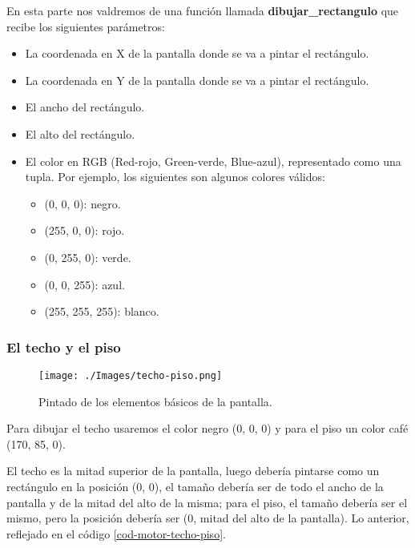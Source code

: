 En esta parte nos valdremos de una función llamada \textbf{dibujar\_rectangulo} que recibe los siguientes parámetros:

\begin{itemize}
\item La coordenada en X de la pantalla donde se va a pintar el rectángulo.
\item La coordenada en Y de la pantalla donde se va a pintar el rectángulo.
\item El ancho del rectángulo.
\item El alto del rectángulo.
\item El color en RGB (Red-rojo, Green-verde, Blue-azul), representado como una tupla. Por ejemplo, los siguientes son algunos colores válidos:
	\begin{itemize}
	\item (0, 0, 0): negro.
	\item (255, 0, 0): rojo.
	\item (0, 255, 0): verde.
	\item (0, 0, 255): azul.
	\item (255, 255, 255): blanco.
	\end{itemize}
\end{itemize}

\subsubsection{El techo y el piso}

\begin{figure}[h!]
	\centering
	\texttt{[image: ./Images/techo-piso.png]}
	\caption{Pintado de los elementos básicos de la pantalla.}
	\label{techo-piso}
\end{figure}

Para dibujar el techo usaremos el color negro (0, 0, 0) y para el piso un color café (170, 85, 0). 

El techo es la mitad superior de la pantalla, luego debería pintarse como un rectángulo en la posición (0, 0), el tamaño debería ser de todo el ancho de la pantalla y de la mitad del alto de la misma; para el piso, el tamaño debería ser el mismo, pero la posición debería ser (0, mitad del alto de la pantalla). Lo anterior, reflejado en el código \ref{cod-motor-techo-piso}.

\newpage



